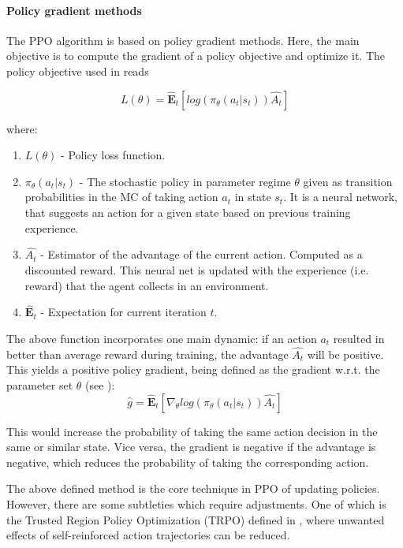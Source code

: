 \documentclass[a4paper,12pt]{article} %
\begin{document}
\paragraph{Policy gradient methods}
The PPO algorithm is based on policy gradient methods. Here, the main objective is to compute the gradient of a policy objective and optimize it. 
The policy objective used in \cite{schulman2017proximal} reads

\begin{equation}
    L(\theta) = \hat{\mathbf{E}}_t [log(\pi_{\theta}(a_t|s_t)) \hat{A_t}]
\end{equation}

where:
\begin{enumerate}
    \item $L(\theta)$ - Policy loss function. 
    \item $\pi_{\theta}(a_t|s_t)$ - The stochastic policy in parameter regime $\theta$ given as transition probabilities in the MC of taking action $a_t$ in state $s_t$. It is a neural network, that suggests an action for a given state based on previous training experience.
    \item $\hat{A_t}$ - Estimator of the advantage of the current action. Computed as a discounted reward. This neural net is updated with the experience (i.e. reward) that the agent collects in an environment.
    \item $\hat{\mathbf{E}}_t$ - Expectation for current iteration $t$.
\end{enumerate}

The above function incorporates one main dynamic: if an action $a_t$ resulted in better than average reward during training, the advantage $\hat{A_t}$ will be positive. This yields a positive policy gradient, being defined as the gradient w.r.t. the parameter set $\theta$ (see \cite{schulman2017proximal}):
\begin{equation}
    \hat{g} = \hat{\mathbf{E}}_t [\nabla_{\theta} log(\pi_{\theta}(a_t|s_t)) \hat{A_t}]
\end{equation}

This would increase the probability of taking the same action decision in the same or similar state. Vice versa, the gradient is negative if the advantage is negative, which reduces the probability of taking the corresponding action.

The above defined method is the core technique in PPO of updating policies. However, there are some subtleties which require adjustments. One of which is the Trusted Region Policy Optimization (TRPO) defined in \cite{schulman2017trust}, where unwanted effects of self-reinforced action trajectories can be reduced. 
\end{document}
